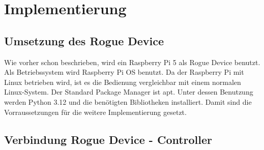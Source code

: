 \chapter{Implementierung}

\section{Umsetzung des Rogue Device}
Wie vorher schon beschrieben, wird ein Raspberry Pi 5 als Rogue Device benutzt. 
Als Betriebssystem wird Raspberry Pi OS benutzt. Da der Raspberry Pi mit Linux betrieben wird, ist es die Bedienung
vergleichbar mit einem normalen Linux-System. Der Standard Package Manager ist apt. Unter dessen Benutzung werden 
Python 3.12 und die benötigten Bibliotheken installiert. Damit sind die Vorraussetzungen für die weitere Implementierung
gesetzt.

\section{Verbindung Rogue Device - Controller} 

